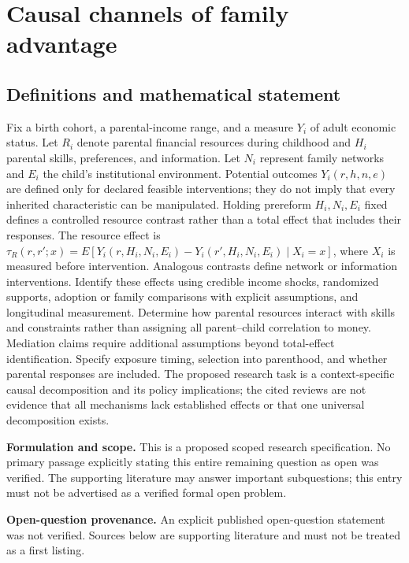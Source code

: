 \documentclass[11pt]{article}
\begin{document}
\section*{Causal channels of family advantage}\label{30007645}
\subsection{Definitions and mathematical statement}
Fix a birth cohort, a parental-income range, and a measure \(Y_i\) of adult economic status. Let \(R_i\) denote parental financial resources during childhood and \(H_i\) parental skills, preferences, and information. Let \(N_i\) represent family networks and \(E_i\) the child's institutional environment. Potential outcomes \(Y_i(r,h,n,e)\) are defined only for declared feasible interventions; they do not imply that every inherited characteristic can be manipulated. Holding prereform \(H_i,N_i,E_i\) fixed defines a controlled resource contrast rather than a total effect that includes their responses. The resource effect is \(\tau_R(r,r';x)=E[Y_i(r,H_i,N_i,E_i)-Y_i(r',H_i,N_i,E_i)\mid X_i=x]\), where \(X_i\) is measured before intervention. Analogous contrasts define network or information interventions. Identify these effects using credible income shocks, randomized supports, adoption or family comparisons with explicit assumptions, and longitudinal measurement. Determine how parental resources interact with skills and constraints rather than assigning all parent--child correlation to money. Mediation claims require additional assumptions beyond total-effect identification. Specify exposure timing, selection into parenthood, and whether parental responses are included. The proposed research task is a context-specific causal decomposition and its policy implications; the cited reviews are not evidence that all mechanisms lack established effects or that one universal decomposition exists.

\par\textbf{Formulation and scope.} This is a proposed scoped research specification. No primary passage explicitly stating this entire remaining question as open was verified. The supporting literature may answer important subquestions; this entry must not be advertised as a verified formal open problem.

\par\textbf{Open-question provenance.} An explicit published open-question statement was not verified. Sources below are supporting literature and must not be treated as a first listing.
\end{document}
